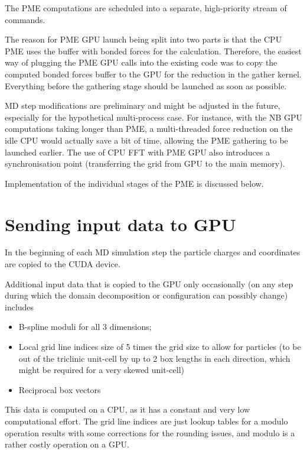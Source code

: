 \documentclass[12pt,a4paper,notitlepage]{report}
\begin{document}
The PME computations are scheduled into a separate, high-priority stream of commands.

The reason for PME GPU launch being split into two parts is that the CPU PME uses the buffer with bonded forces for the calculation.
Therefore, the easiest way of plugging the PME GPU calls into the existing code was to copy the computed bonded forces buffer to the GPU for the reduction in the gather kernel. Everything before the gathering stage should be launched as soon as possible.

MD step modifications are preliminary and might be adjusted in the future, especially for the hypothetical multi-process case. For instance, with the NB GPU computations taking longer than PME, a multi-threaded force reduction on the idle CPU would actually save a bit of time, allowing the PME gathering to be launched earlier. The use of CPU FFT with PME GPU also introduces a synchronisation point (transferring the grid from GPU to the main memory).




Implementation of the individual stages of the PME is discussed below.

\section{Sending input data to GPU}
In the beginning of each MD simulation step the particle charges and coordinates are copied to the CUDA device.

Additional input data that is copied to the GPU only occasionally (on any step during which the domain decomposition or configuration can possibly change) includes
\begin{itemize}
\item B-spline moduli for all 3 dimensions;
\item Local grid line indices size of 5 times the grid size to allow for particles (to be out of the triclinic unit-cell by up to 2 box lengths in each direction, which might be required for a very skewed unit-cell)
\item Reciprocal box vectors
\end{itemize}
This data is computed on a CPU, as it has a constant and very low computational effort. The grid line indices are just lookup tables for a modulo operation results with some corrections for the rounding issues, and modulo is a rather costly operation on a GPU.
\end{document}
